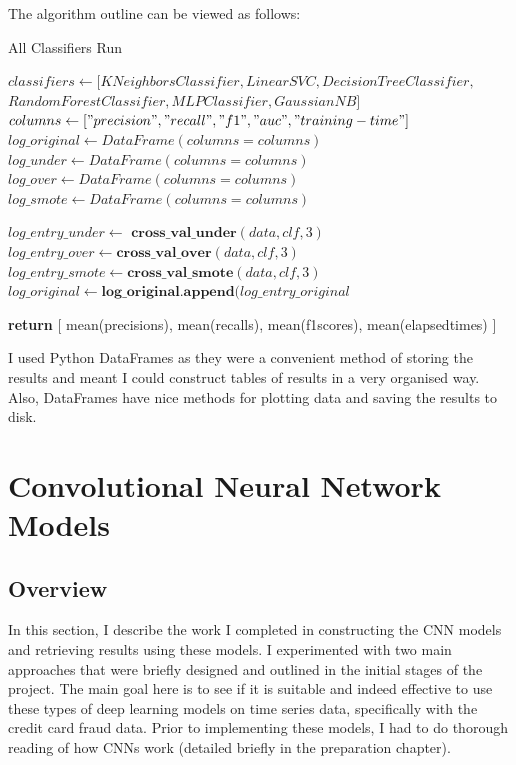\documentclass[12pt,a4paper,twoside]{report}
\begin{document}
The algorithm outline can be viewed as follows:

\begin{algorithm}[H]
\caption{All Classifiers Run }\label{all-classifiers}
\begin{algorithmic}[1]
        \State
         \texttt{\State $classifiers \gets [KNeighborsClassifier, LinearSVC, DecisionTreeClassifier,$\\ $RandomForestClassifier, MLPClassifier, GaussianNB]$}
          \texttt{\State $columns \gets ["precision", "recall", "f1", "auc", "training-time"]$}
         \texttt{\State $log\_original \gets DataFrame(columns = columns)$}
         \texttt{\State $log\_under \gets DataFrame(columns = columns)$}
         \texttt{\State $log\_over \gets DataFrame(columns = columns)$}
         \texttt{\State $log\_smote \gets DataFrame(columns = columns)$}
         

            	\State $log\_entry\_under\gets  \textbf{ cross\_val\_under}(data, clf, 3) $
            	\State $log\_entry\_over \gets \textbf{cross\_val\_over}(data, clf, 3) $
            	\State $log\_entry\_smote \gets \textbf{cross\_val\_smote}(data, clf, 3) $
            	\State $log\_original \gets \textbf{log\_original.append}(log\_entry\_original $
   	\EndFor
   
   \State \textbf{return} [ mean(precisions), mean(recalls), mean(f1scores), mean(elapsedtimes) ]
   
\EndProcedure
\end{algorithmic}
\end{algorithm}

I used Python DataFrames as they were a convenient method of storing the results and meant I could construct tables of results in a very organised way. Also, DataFrames have nice methods for plotting data and saving the results to disk. 


\section{Convolutional Neural Network Models}

\subsection{Overview}
In this section, I describe the work I completed in constructing the CNN models and retrieving results using these models. I experimented with two main approaches that were briefly designed and outlined in the initial stages of the project. The main goal here is to see if it is suitable and indeed effective to use these types of deep learning models on time series data, specifically with the credit card fraud data. Prior to implementing these models, I had to do thorough reading of how CNNs work (detailed briefly in the preparation chapter).
\end{document}
